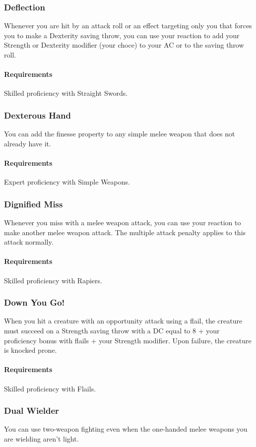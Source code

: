 \subsubsection{Deflection} \label{feat::deflection}
    Whenever you are hit by an attack roll or an effect targeting only you that forces you to make a Dexterity saving throw, you can use your reaction to add your Strength or Dexterity modifier (your choce) to your AC or to the saving throw roll.
    \paragraph{Requirements} Skilled proficiency with Straight Swords.
\subsubsection{Dexterous Hand} \label{feat::dexteroushand}
    You can add the finesse property to any simple melee weapon that does not already have it.
    \paragraph{Requirements} Expert proficiency with Simple Weapons.
\subsubsection{Dignified Miss} \label{feat::dignifiedmiss}
    Whenever you miss with a melee weapon attack, you can use your reaction to make another melee weapon attack.
    The multiple attack penalty applies to this attack normally.
    \paragraph{Requirements} Skilled proficiency with Rapiers.
\subsubsection{Down You Go!} \label{feat::downyougo}
    When you hit a creature with an opportunity attack using a flail, the creature must succeed on a Strength saving throw with a DC equal to 8 + your proficiency bonus with flails + your Strength modifier.
    Upon failure, the creature is knocked prone.
    \paragraph{Requirements} Skilled proficiency with Flails.
\subsubsection{Dual Wielder} \label{feat::dualwielder}
    You can use two-weapon fighting even when the one-handed melee weapons you are wielding aren't light.

